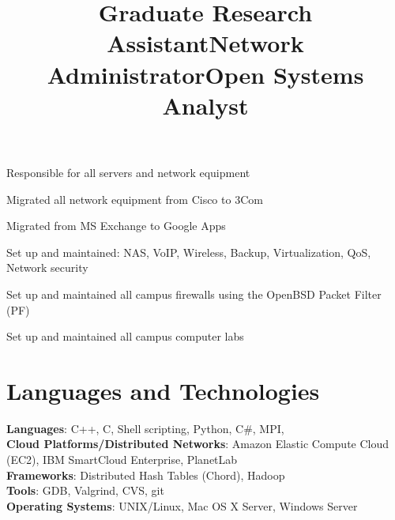 \documentclass[margin,line]{resume}
\begin{document}
\begin{resume}
    \title{\textbf{Graduate Research Assistant}}
    \begin{position}\end{position}
    
    \title{\textbf{Network Administrator}}
    \begin{position}
    \vspace{-2mm}
    \begin{list2}
    \item Responsible for all servers and network equipment
    \item Migrated all network equipment from Cisco to 3Com
    \item Migrated from MS Exchange to Google Apps
    \item Set up and maintained: NAS, VoIP, Wireless, Backup, Virtualization, QoS, Network security
    \end{list2}
    \end{position}

\newpage

    \title{\textbf{Open Systems Analyst}}
    \begin{position}
    \vspace{-2mm}
    \begin{list2}
    \item Set up and maintained all campus firewalls using the OpenBSD Packet Filter (PF)
    \item Set up and maintained all campus computer labs
    \end{list2}
    \end{position}

    \section{\mysidestyle Languages and Technologies} 

    \textbf{Languages}: C++, C, Shell scripting, Python, C\#, MPI, \LaTeXe\\
    \textbf{Cloud Platforms/Distributed Networks}: Amazon Elastic Compute Cloud (EC2), IBM SmartCloud Enterprise, PlanetLab\\
    \textbf{Frameworks}: Distributed Hash Tables (Chord), Hadoop\\
    \textbf{Tools}: GDB, Valgrind, CVS, git\\
    \textbf{Operating Systems}: {\sc UNIX}/Linux, Mac OS X Server, Windows Server
    

\end{resume}
\end{document}
